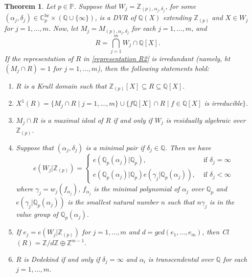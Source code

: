 \documentclass[10pt]{article}
\numberwithin{equation}{section}
\newtheorem{Thm}[equation]{Theorem}
\theoremstyle{definition}
\theoremstyle{definition}
\newcommand{\Q}{\mathbb{Q}}
\newcommand{\Z}{\mathbb{Z}}
\newcommand{\C}{\mathbb{C}}
\newcommand{\PP}{\mathbb{P}}
\newcommand{\br}{\text{br}}
\newcommand\rc { \color{red}}
\newcommand\bc { \color{blue}}
\begin{document}
\begin{Thm} \label{characterization local Krull domain}
Let $p\in\PP$. Suppose that $W_j=\Z_{(p),\alpha_j,\delta_j}$, for some $(\alpha_j,\delta_j)\in\C_p^{\br}\times(\Q\cup\{\infty\})$, 
is a DVR of $\Q(X)$ extending $\Z_{(p)}$ and $X \in W_j$ for $j = 1, \dots , m$. Now, let
 $M_j=M_{(p),\alpha_j,\delta_j}$ for each $j=1,\ldots,m$, and
\begin{equation}\label{representation R2}
R = \bigcap_{j=1}^m W_j\cap\Q[X].
\end{equation}
\noindent
If the representation of $R$ in \eqref{representation R2} is  irredundant (namely,  ht$(M_j \cap R)=1$ for $j=1, \dots , m$), then the following statements hold:
\begin{enumerate}
\item[{\em (1)}] $R$ is a Krull domain such that $\Z_{(p)}[X] \subseteq R \subseteq \Q[X]$.
\item[{\em (2)}] $X^1(R) = \{M_j \cap R \mid j =1, \dots , m\} \cup \{f\Q[X] \cap R \mid f \in \Q[X]$ is irreducible$\}$.
\item[{\em (3)}] $M_{j} \cap R$ is a maximal ideal of $R$ if and only if $W_j$
is residually algebraic over $\Z_{(p)}$.
\item[{\em (4)}] Suppose that $(\alpha_j,\delta_j)$ is a minimal pair if $\delta_j\in\Q$. Then we have
 $$e(W_j|\Z_{(p)}) = \left\{\begin{array}{cc}
e(\Q_p(\alpha_j)|\Q_p),&\text{ if } \delta_j = \infty\\
e(\Q_p(\alpha_j)|\Q_p)e(\gamma_j|\Q_p(\alpha_j)) ,&\text{ if } \delta_j < \infty
\end{array}\right.$$
where $\gamma_j=w_j(f_{\alpha_j})$, $f_{\alpha_j}$ is the minimal polynomial of $\alpha_j$ over $\Q_p$ and $e(\gamma_j|\Q_p(\alpha_j))$ 
is the smallest natural number $n$ such that $n\gamma_j$ is in the value group of $\Q_p(\alpha_j)$.

\item[{\em (5)}] If $e_j = e(W_j|\Z_{(p)})$ for $j=1, \dots , m$ and $d= gcd(e_1, \dots , e_m)$, then
Cl$(R) = \Z/d\Z \oplus \Z^{m-1}$.


\item[{\em (6)}] $R$ is Dedekind if and only if $\delta_j=\infty$  and $\alpha_i$ is transcendental over $\mathbb{Q}$ for each $j=1,\ldots,m$.
\end{enumerate}
\end{Thm}
\end{document}
